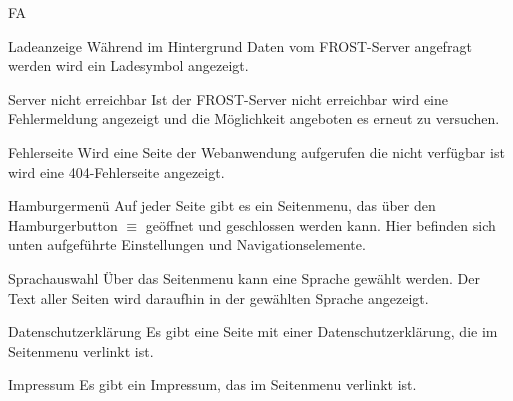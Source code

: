 \begin{Kriterien}{FA}
  \item[Ladeanzeige]
    Während im Hintergrund Daten vom \gls{FROST-Server} angefragt werden wird ein Ladesymbol angezeigt.

  \item[Server nicht erreichbar]
    Ist der \gls{FROST-Server} nicht erreichbar wird eine Fehlermeldung angezeigt und die Möglichkeit angeboten es erneut zu 
    versuchen.

  \item[Fehlerseite]
    Wird eine Seite der \gls{Webanwendung} aufgerufen die nicht verfügbar ist wird eine 404-Fehlerseite angezeigt.

  \item[Hamburgermenü]
    Auf jeder Seite gibt es ein \gls{Seitenmenu}, das über den Hamburgerbutton $\equiv$ geöffnet und geschlossen werden kann.
    Hier befinden sich unten aufgeführte Einstellungen und Navigationselemente.

  \item[Sprachauswahl]
    Über das \gls{Seitenmenu} kann eine Sprache gewählt werden. Der Text aller Seiten wird daraufhin in der gewählten Sprache 
    angezeigt.

  \item[Datenschutzerklärung]
    Es gibt eine Seite mit einer Datenschutzerklärung, die im \gls{Seitenmenu} verlinkt ist.

  \item[Impressum]
    Es gibt ein Impressum, das im \gls{Seitenmenu} verlinkt ist.
\end{Kriterien}
